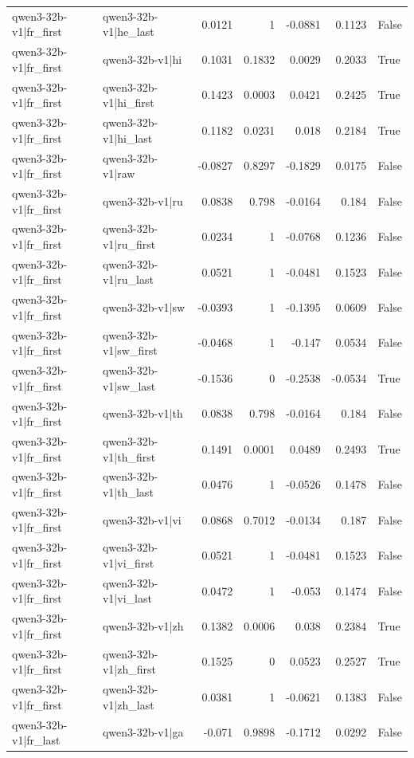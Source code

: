 \begin{table}
\begin{tabular}{l l r r r r l}
qwen3-32b-v1|fr_first & qwen3-32b-v1|he_last & 0.0121 & 1 & -0.0881 & 0.1123 & False \\
qwen3-32b-v1|fr_first & qwen3-32b-v1|hi & 0.1031 & 0.1832 & 0.0029 & 0.2033 & True \\
qwen3-32b-v1|fr_first & qwen3-32b-v1|hi_first & 0.1423 & 0.0003 & 0.0421 & 0.2425 & True \\
qwen3-32b-v1|fr_first & qwen3-32b-v1|hi_last & 0.1182 & 0.0231 & 0.018 & 0.2184 & True \\
qwen3-32b-v1|fr_first & qwen3-32b-v1|raw & -0.0827 & 0.8297 & -0.1829 & 0.0175 & False \\
qwen3-32b-v1|fr_first & qwen3-32b-v1|ru & 0.0838 & 0.798 & -0.0164 & 0.184 & False \\
qwen3-32b-v1|fr_first & qwen3-32b-v1|ru_first & 0.0234 & 1 & -0.0768 & 0.1236 & False \\
qwen3-32b-v1|fr_first & qwen3-32b-v1|ru_last & 0.0521 & 1 & -0.0481 & 0.1523 & False \\
qwen3-32b-v1|fr_first & qwen3-32b-v1|sw & -0.0393 & 1 & -0.1395 & 0.0609 & False \\
qwen3-32b-v1|fr_first & qwen3-32b-v1|sw_first & -0.0468 & 1 & -0.147 & 0.0534 & False \\
qwen3-32b-v1|fr_first & qwen3-32b-v1|sw_last & -0.1536 & 0 & -0.2538 & -0.0534 & True \\
qwen3-32b-v1|fr_first & qwen3-32b-v1|th & 0.0838 & 0.798 & -0.0164 & 0.184 & False \\
qwen3-32b-v1|fr_first & qwen3-32b-v1|th_first & 0.1491 & 0.0001 & 0.0489 & 0.2493 & True \\
qwen3-32b-v1|fr_first & qwen3-32b-v1|th_last & 0.0476 & 1 & -0.0526 & 0.1478 & False \\
qwen3-32b-v1|fr_first & qwen3-32b-v1|vi & 0.0868 & 0.7012 & -0.0134 & 0.187 & False \\
qwen3-32b-v1|fr_first & qwen3-32b-v1|vi_first & 0.0521 & 1 & -0.0481 & 0.1523 & False \\
qwen3-32b-v1|fr_first & qwen3-32b-v1|vi_last & 0.0472 & 1 & -0.053 & 0.1474 & False \\
qwen3-32b-v1|fr_first & qwen3-32b-v1|zh & 0.1382 & 0.0006 & 0.038 & 0.2384 & True \\
qwen3-32b-v1|fr_first & qwen3-32b-v1|zh_first & 0.1525 & 0 & 0.0523 & 0.2527 & True \\
qwen3-32b-v1|fr_first & qwen3-32b-v1|zh_last & 0.0381 & 1 & -0.0621 & 0.1383 & False \\
qwen3-32b-v1|fr_last & qwen3-32b-v1|ga & -0.071 & 0.9898 & -0.1712 & 0.0292 & False \\

\end{tabular}
\end{table}
